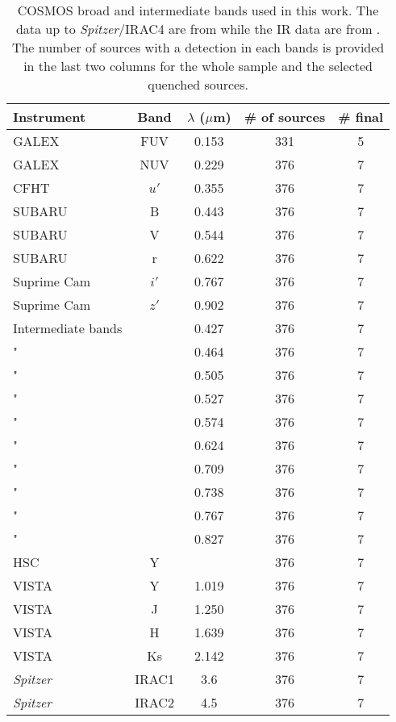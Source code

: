 \documentclass[traditabstract]{aa} %
\begin{document}
\begin{table}
	\centering
	\caption{COSMOS broad and intermediate bands used in this work. The data up to \textit{Spitzer}/IRAC4 are from \cite{Laigle16} while the IR data are from \cite{Jin18}. The number of sources with a detection in each bands is provided in the last two columns for the whole sample and the selected quenched sources.}
	\begin{tabular}{l c c c c}
	 \hline\hline
	Instrument & Band & $\lambda$ ($\mu$m) & \# of sources & \# final \\ 
	\hline
	GALEX            & FUV & 0.153 & 331  & 5\\
	GALEX            & NUV & 0.229 &  376  & 7\\
	CFHT        & $u'$ & 0.355 & 376   & 7\\
	SUBARU          & B & 0.443&  376  & 7\\
	SUBARU         & V & 0.544& 376 & 7\\	   
	SUBARU         & r & 0.622&376  & 7\\	 
	Suprime Cam    & $i'$ & 0.767& 376 & 7\\	
	Suprime Cam    & $z'$ & 0.902& 376 & 7\\	
	Intermediate bands &  & 0.427  & 376 & 7\\
	      "              &  & 0.464  & 376 & 7\\
	      "              &  & 0.505 & 376 & 7\\
	   "             &  & 0.527 & 376 & 7\\
	       "             &  & 0.574 & 376 & 7\\
	       "             &  & 0.624 & 376 & 7\\
	       "             &  & 0.709 & 376 & 7\\
	       "             &  & 0.738 & 376 & 7\\
	       "             &  & 0.767& 376 & 7\\
	       "             &  & 0.827& 376 & 7\\
	HSC            & Y &  & 376 & 7\\	  
	VISTA            & Y & 1.019& 376 & 7\\	
	VISTA            & J & 1.250& 376 & 7\\	
	VISTA            & H & 1.639& 376 & 7\\	
	VISTA            & Ks & 2.142& 376 & 7\\	
	\textit{Spitzer} & IRAC1 & 3.6& 376 & 7\\	
	\textit{Spitzer} & IRAC2 & 4.5& 376 & 7\\	

\end{tabular}
\end{table}
\end{document}
